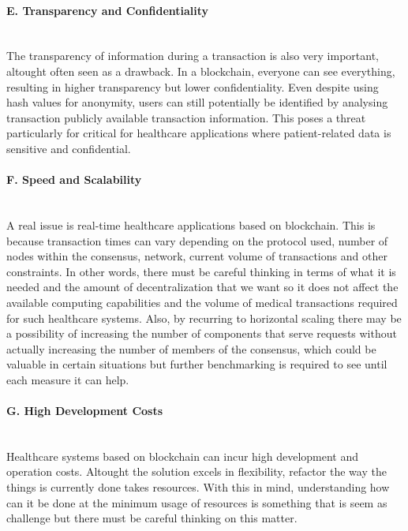 \paragraph{E. Transparency and Confidentiality} \mbox{}\\
The transparency of information during a transaction is also very important, altought often seen as a drawback. In a blockchain, everyone can see everything, resulting in higher transparency but lower confidentiality. Even  despite using hash values for anonymity, users can still potentially be identified by analysing transaction publicly available transaction information. This poses a threat particularly for critical for healthcare applications where patient-related data is sensitive and confidential.

\paragraph{F. Speed and Scalability} \mbox{}\\
A real issue is real-time healthcare applications based on blockchain. This is because transaction times can vary depending on the protocol used, number of nodes within the consensus, network, current volume of transactions and other constraints. In other words, there must be careful thinking in terms of what it is needed and the amount of decentralization that we want so it does not affect the available computing capabilities and the volume of medical transactions required for such healthcare systems. Also, by recurring to horizontal scaling there may be a possibility of increasing the number of components that serve requests without actually increasing the number of members of the consensus, which could be valuable in certain situations but further benchmarking is required to see until each measure it can help.

\paragraph{G. High Development Costs} \mbox{}\\
Healthcare systems based on blockchain can incur high development and operation costs. Altought the solution excels in flexibility, refactor the way the things is currently done takes resources. With this in mind, understanding how can it be done at the minimum usage of resources is something that is seem as challenge but there must be careful thinking on this matter.

